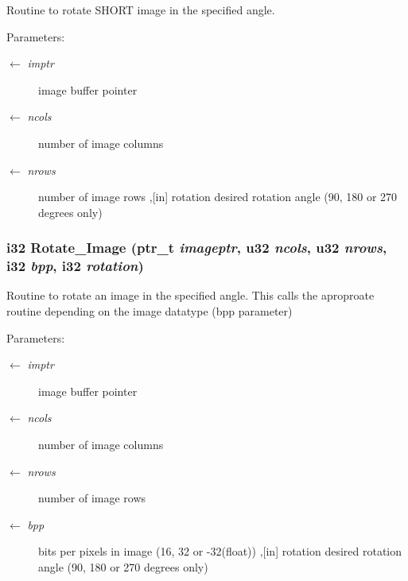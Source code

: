 Routine to rotate SHORT image in the specified angle. \begin{Desc}
\item[Parameters:]
\begin{description}
\item[\mbox{$\leftarrow$} {\em imptr}]image buffer pointer \item[\mbox{$\leftarrow$} {\em ncols}]number of image columns \item[\mbox{$\leftarrow$} {\em nrows}]number of image rows ,[in] rotation desired rotation angle (90, 180 or 270 degrees only) \end{description}
\end{Desc}
\subsubsection{\setlength{\rightskip}{0pt plus 5cm}i32 Rotate\_\-Image (ptr\_\-t {\em imageptr}, u32 {\em ncols}, u32 {\em nrows}, i32 {\em bpp}, i32 {\em rotation})}\label{GU__transformations_8c_4f3146b6980c53fdb4f0c2c7aaf03d39}


Routine to rotate an image in the specified angle. This calls the aproproate routine depending on the image datatype (bpp parameter) \begin{Desc}
\item[Parameters:]
\begin{description}
\item[\mbox{$\leftarrow$} {\em imptr}]image buffer pointer \item[\mbox{$\leftarrow$} {\em ncols}]number of image columns \item[\mbox{$\leftarrow$} {\em nrows}]number of image rows \item[\mbox{$\leftarrow$} {\em bpp}]bits per pixels in image (16, 32 or -32(float)) ,[in] rotation desired rotation angle (90, 180 or 270 degrees only) \end{description}
\end{Desc}

